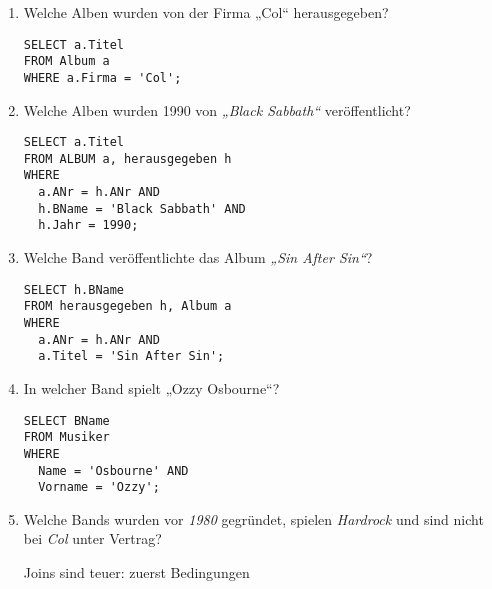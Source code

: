 \documentclass{bschlangaul-aufgabe}
\begin{document}
\begin{enumerate}


\item Welche Alben wurden von der Firma „Col“ herausgegeben?

\begin{bAntwort}
\begin{verbatim}
SELECT a.Titel
FROM Album a
WHERE a.Firma = 'Col';
\end{verbatim}
\end{bAntwort}


\item Welche Alben wurden 1990 von \emph{„Black Sabbath“}
veröffentlicht?

\begin{bAntwort}
\begin{verbatim}
SELECT a.Titel
FROM ALBUM a, herausgegeben h
WHERE
  a.ANr = h.ANr AND
  h.BName = 'Black Sabbath' AND
  h.Jahr = 1990;
\end{verbatim}
\end{bAntwort}


\item Welche Band veröffentlichte das Album \emph{„Sin After Sin“}?

\begin{bAntwort}
\begin{verbatim}
SELECT h.BName
FROM herausgegeben h, Album a
WHERE
  a.ANr = h.ANr AND
  a.Titel = 'Sin After Sin';
\end{verbatim}
\end{bAntwort}


\item In welcher Band spielt „Ozzy Osbourne“?

\begin{bAntwort}
\begin{verbatim}
SELECT BName
FROM Musiker
WHERE
  Name = 'Osbourne' AND
  Vorname = 'Ozzy';
\end{verbatim}
\end{bAntwort}


\item Welche Bands wurden vor \emph{1980} gegründet, spielen
\emph{Hardrock} und sind nicht bei \emph{Col} unter Vertrag?

\begin{bAntwort}
Joins sind teuer: zuerst Bedingungen


\end{bAntwort}
\end{enumerate}
\end{document}
